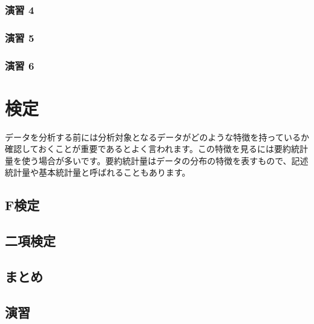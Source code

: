 \documentclass[
  12pt,
]{book}
\begin{document}
\hypertarget{ux6f14ux7fd2-4-1}{%
\subsubsection*{演習 4}\label{ux6f14ux7fd2-4-1}}

\hypertarget{ux6f14ux7fd2-5}{%
\subsubsection*{演習 5}\label{ux6f14ux7fd2-5}}

\hypertarget{ux6f14ux7fd2-6}{%
\subsubsection*{演習 6}\label{ux6f14ux7fd2-6}}

\hypertarget{ux691cux5b9a}{%
\section{検定}\label{ux691cux5b9a}}

データを分析する前には分析対象となるデータがどのような特徴を持っているか確認しておくことが重要であるとよく言われます。この特徴を見るには要約統計量を使う場合が多いです。要約統計量はデータの分布の特徴を表すもので、記述統計量や基本統計量と呼ばれることもあります。

\hypertarget{fux691cux5b9a}{%
\subsection{F検定}\label{fux691cux5b9a}}

\hypertarget{ux4e8cux9805ux691cux5b9a}{%
\subsection{二項検定}\label{ux4e8cux9805ux691cux5b9a}}

\hypertarget{ux307eux3068ux3081-3}{%
\subsection{まとめ}\label{ux307eux3068ux3081-3}}

\hypertarget{ux6f14ux7fd2-7}{%
\subsection{演習}\label{ux6f14ux7fd2-7}}
\end{document}
